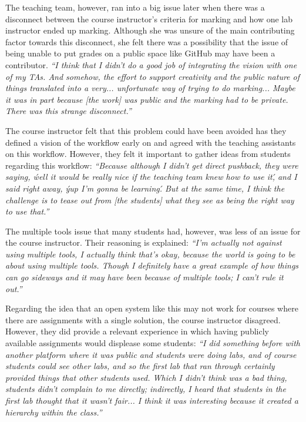 The teaching team, however, ran into a big issue later when there was a disconnect between the course instructor's criteria for marking and how one lab instructor ended up marking. Although she was unsure of the main contributing factor towards this disconnect, she felt there was a possibility that the issue of being unable to put grades on a public space like GitHub may have been a contributor. \textit{``I think that I didn't do a good job of integrating the vision with one of my TAs. And somehow, the effort to support creativity and the public nature of things translated into a very... unfortunate way of trying to do marking... Maybe it was in part because [the work] was public and the marking had to be private. There was this strange disconnect.''}

The course instructor felt that this problem could have been avoided has they defined a vision of the workflow early on and agreed with the teaching assistants on this workflow. However, they felt it important to gather ideas from students regarding this workflow: \textit{``Because although I didn't get direct pushback, they were saying, \'well it would be really nice if the teaching team knew how to use it\', and I said right away, \'yup I'm gonna be learning\'. But at the same time, I think the challenge is to tease out from [the students] what they see as being the right way to use that.''}

The multiple tools issue that many students had, however, was less of an issue for the course instructor. Their reasoning is explained: \textit{``I'm actually not against using multiple tools, I actually think that's okay, because the world is going to be about using multiple tools. Though I definitely have a great example of how things can go sideways and it may have been because of multiple tools; I can't rule it out.''}

Regarding the idea that an open system like this may not work for courses where there are assignments with a single solution, the course instructor disagreed. However, they did provide a relevant experience in which having publicly available assignments would displease some students: \textit{``I did something before with another platform where it was public and students were doing labs, and of course students could see other labs, and so the first lab that ran through certainly provided things that other students used. Which I didn't think was a bad thing, students didn't complain to me directly; indirectly, I heard that students in the first lab thought that it wasn't fair... I think it was interesting because it created a hierarchy within the class.''}

